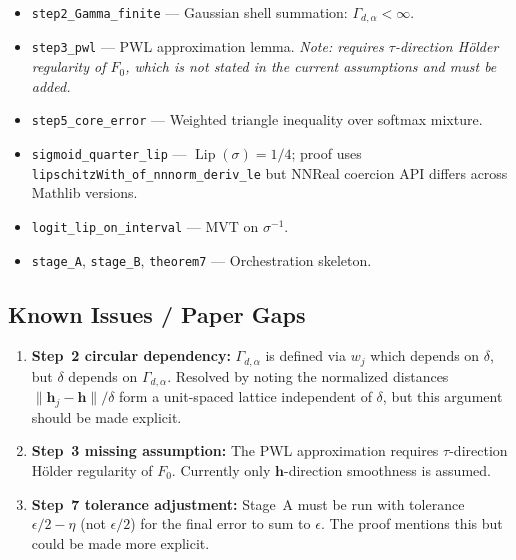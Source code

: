 \documentclass[12pt]{article}
\theoremstyle{remark}
\begin{document}
\begin{itemize}
  \item \texttt{step2\_Gamma\_finite} — Gaussian shell summation: $\Gamma_{d,\alpha} < \infty$.
  \item \texttt{step3\_pwl} — PWL approximation lemma.
    \emph{Note: requires $\tau$-direction H\"older regularity of $F_0$, which is
    not stated in the current assumptions and must be added.}
  \item \texttt{step5\_core\_error} — Weighted triangle inequality over softmax mixture.
  \item \texttt{sigmoid\_quarter\_lip} — $\operatorname{Lip}(\sigma)=1/4$; proof uses
    \texttt{lipschitzWith\_of\_nnnorm\_deriv\_le} but NNReal coercion API differs
    across Mathlib versions.
  \item \texttt{logit\_lip\_on\_interval} — MVT on $\sigma^{-1}$.
  \item \texttt{stage\_A}, \texttt{stage\_B}, \texttt{theorem7} — Orchestration skeleton.
\end{itemize}

\subsection*{Known Issues / Paper Gaps}

\begin{enumerate}
  \item \textbf{Step~2 circular dependency:} $\Gamma_{d,\alpha}$ is defined via $w_j$
    which depends on $\delta$, but $\delta$ depends on $\Gamma_{d,\alpha}$.
    Resolved by noting the normalized distances $\|\boldsymbol{h}_j-\boldsymbol{h}\|/\delta$
    form a unit-spaced lattice independent of $\delta$, but this argument
    should be made explicit.

  \item \textbf{Step~3 missing assumption:} The PWL approximation requires
    $\tau$-direction H\"older regularity of $F_0$.
    Currently only $\boldsymbol{h}$-direction smoothness is assumed.

  \item \textbf{Step~7 tolerance adjustment:} Stage~A must be run with tolerance
    $\epsilon/2 - \eta$ (not $\epsilon/2$) for the final error to sum to $\epsilon$.
    The proof mentions this but could be made more explicit.
\end{enumerate}
\end{document}
